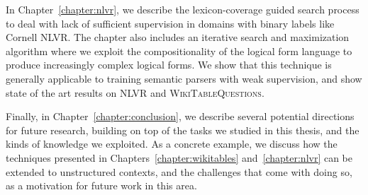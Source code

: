 In Chapter~\ref{chapter:nlvr}, we describe the lexicon-coverage guided search process to deal with
lack of sufficient supervision in domains with binary labels like Cornell NLVR\@.  The chapter also
includes an iterative search and maximization algorithm where we exploit the compositionality of the
logical form language to produce increasingly complex logical forms. We show that this technique is
generally applicable to training semantic parsers with weak supervision, and show state of the art
results on NLVR and \textsc{WikiTableQuestions}.

Finally, in Chapter~\ref{chapter:conclusion}, we describe several potential directions for
future research, building on top of the tasks we studied in this thesis, and the kinds of knowledge
we exploited. As a concrete example, we discuss how the techniques presented in
Chapters~\ref{chapter:wikitables} and~\ref{chapter:nlvr} can be extended to unstructured contexts,
and the challenges that come with doing so, as a motivation for future work in this area.

